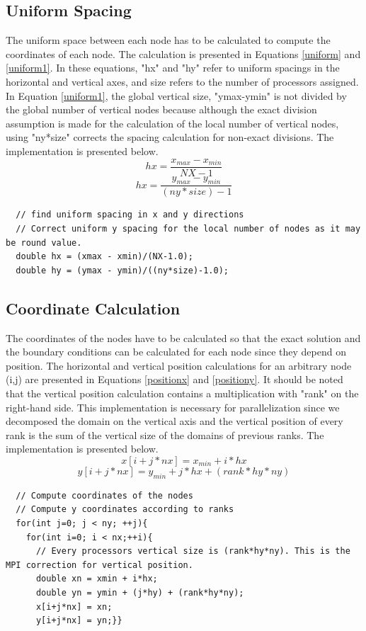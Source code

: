 \documentclass[12pt]{article}
\begin{document}
\subsection{Uniform Spacing}
The uniform space between each node has to be calculated to compute the coordinates of each node. The calculation is presented in Equations \ref{uniform} and \ref{uniform1}. In these equations, "hx" and "hy" refer to uniform spacings in the horizontal and vertical axes, and size refers to the number of processors assigned. In Equation \ref{uniform1}, the global vertical size, "ymax-ymin" is not divided by the global number of vertical nodes because although the exact division assumption is made for the calculation of the local number of vertical nodes, using "ny*size" corrects the spacing calculation for non-exact divisions. The implementation is presented below.
\begin{equation}
    \label{uniform}
    hx = \frac{x_{max}-x_{min}}{NX-1}
\end{equation}
\begin{equation}
    \label{uniform1}
    hx = \frac{y_{max}-y_{min}}{(ny*size)-1}
\end{equation}
    \begin{verbatim}
  // find uniform spacing in x and y directions
  // Correct uniform y spacing for the local number of nodes as it may be round value.
  double hx = (xmax - xmin)/(NX-1.0); 
  double hy = (ymax - ymin)/((ny*size)-1.0);
    \end{verbatim}
\subsection{Coordinate Calculation}
The coordinates of the nodes have to be calculated so that the exact solution and the boundary conditions can be calculated for each node since they depend on position. The horizontal and vertical position calculations for an arbitrary node (i,j) are presented in Equations \ref{positionx} and \ref{positiony}. It should be noted that the vertical position calculation contains a multiplication with "rank" on the right-hand side. This implementation is necessary for parallelization since we decomposed the domain on the vertical axis and the vertical position of every rank is the sum of the vertical size of the domains of previous ranks. The implementation is presented below.
\begin{equation}
    \label{positionx}
    x[i+j*nx] = x_{min} + i*hx
\end{equation}
\begin{equation}
    \label{positiony}
    y[i+j*nx] = y_{min} + j*hx + (rank*hy*ny)
\end{equation}
    \begin{verbatim}
  // Compute coordinates of the nodes
  // Compute y coordinates according to ranks
  for(int j=0; j < ny; ++j){ 
    for(int i=0; i < nx;++i){
      // Every processors vertical size is (rank*hy*ny). This is the MPI correction for vertical position.
      double xn = xmin + i*hx; 
      double yn = ymin + (j*hy) + (rank*hy*ny);
      x[i+j*nx] = xn; 
      y[i+j*nx] = yn;}}
    \end{verbatim}
\end{document}
